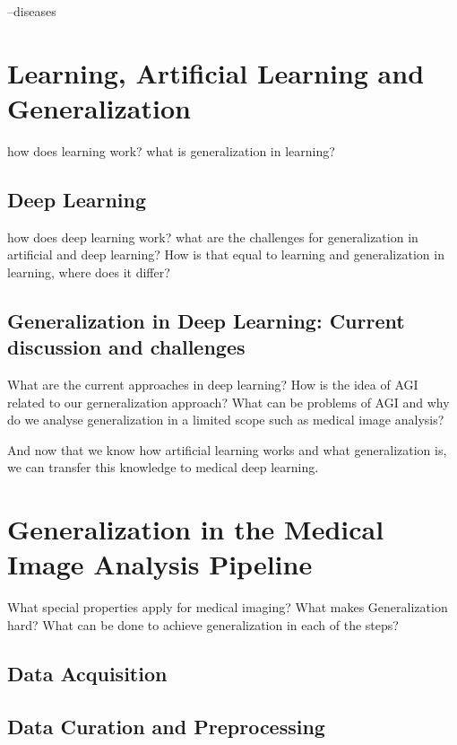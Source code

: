 --diseases




\section{Learning, Artificial Learning and Generalization}
    how does learning work?
    what is generalization in learning?

    \subsection{Deep Learning}
        how does deep learning work?
        what are the challenges for generalization in artificial and deep learning?
        How is that equal to learning and generalization in learning, where does it differ?

    \subsection{Generalization in Deep Learning: Current discussion and challenges}
        What are the current approaches in deep learning? How is the idea of AGI related to our gerneralization approach? What can be problems of AGI and why do we analyse generalization in a limited scope such as medical image analysis?



    And now that we know how artificial learning works and what generalization is, we can transfer this knowledge to medical deep learning.

\section{Generalization in the Medical Image Analysis Pipeline}
    What special properties apply for medical imaging?
    What makes Generalization hard?
    What can be done to achieve generalization in each of the steps?

    \subsection{Data Acquisition}
    \subsection{Data Curation and Preprocessing}

